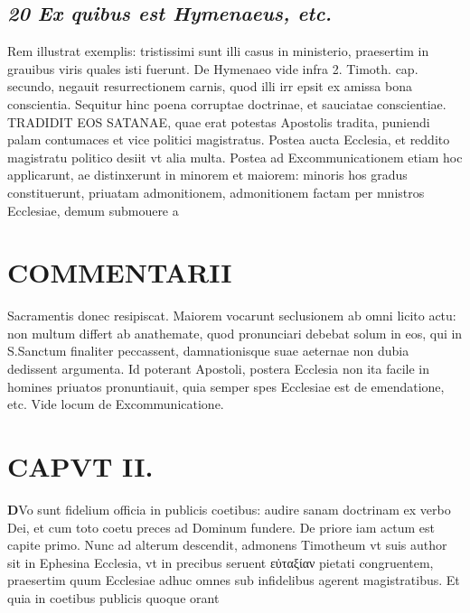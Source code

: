 \documentclass{article}
\begin{document}
\begin{pages}
\subsection*{\textit{20 Ex quibus est Hymenaeus, etc. }}\pstart Rem illustrat exemplis: tristissimi sunt illi casus in ministerio, praesertim in grauibus viris quales isti fuerunt. De Hymenaeo vide infra 2. Timoth. cap. secundo, negauit resurrectionem carnis, quod illi irr epsit ex amissa bona conscientia. Sequitur hinc poena corruptae doctrinae, et sauciatae conscientiae. TRADIDIT EOS SATANAE, quae erat potestas Apostolis tradita, puniendi palam contumaces et vice politici magistratus. Postea aucta Ecclesia, et reddito magistratu politico desiit vt alia multa. Postea ad Excommunicationem etiam hoc applicarunt, ae distinxerunt in minorem et maiorem: minoris hos gradus constituerunt, priuatam admonitionem, admonitionem factam per mnistros Ecclesiae, demum submouere a  \pend
\section*{COMMENTARII }
\marginpar{[ p.42 ]}\pstart Sacramentis donec resipiscat.  \pend\pstart Maiorem vocarunt seclusionem ab omni licito actu: non multum differt ab anathemate, quod pronunciari debebat solum in eos, qui in S.Sanctum finaliter peccassent, damnationisque suae aeternae non dubia dedissent argumenta. Id poterant Apostoli, postera Ecclesia non ita facile in homines priuatos pronuntiauit, quia semper spes Ecclesiae est de emendatione, etc. Vide locum de Excommunicatione.  \pend
\endnumbering\beginnumbering\section{CAPVT II.}\pstart \huge\textbf{D}\normalsize Vo sunt fidelium officia in publicis coetibus: audire sanam doctrinam ex verbo Dei, et cum toto coetu preces ad Dominum fundere. De priore iam actum est capite primo. Nunc ad alterum descendit, admonens Timotheum vt suis author sit in Ephesina Ecclesia, vt in precibus seruent εὐταξίαν pietati congruentem, praesertim quum Ecclesiae adhuc omnes sub infidelibus agerent magistratibus.  \pend\pstart Et quia in coetibus publicis quoque orant  \pend

\end{pages}
\end{document}
